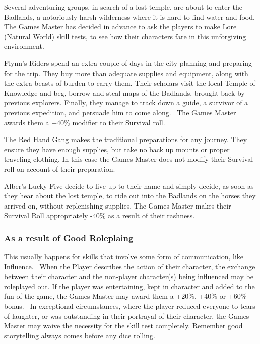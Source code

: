 \begin{rpg-examplebox}
Several adventuring groups, in search of a lost temple, are about to enter the Badlands, a notoriously harsh wilderness where it is hard to find water and food. The Games Master has decided in advance to ask the players to make Lore (Natural World) skill tests, to see how their characters fare in this unforgiving environment.

Flynn’s Riders spend an extra couple of days in the city planning and preparing for the trip. They buy more than adequate supplies and equipment, along with the extra beasts of burden to carry them. Their scholars visit the local Temple of Knowledge and beg, borrow and steal maps of the Badlands, brought back by previous explorers. Finally, they manage to track down a guide, a survivor of a previous expedition, and persuade him to come along.  The Games Master awards them a +40\% modifier to their Survival roll.

The Red Hand Gang makes the traditional preparations for any journey. They ensure they have enough supplies, but take no back up mounts or proper traveling clothing. In this case the Games Master does not modify their Survival roll on account of their preparation.

Alber’s Lucky Five decide to live up to their name and simply decide, as soon as they hear about the lost temple, to ride out into the Badlands on the horses they arrived on, without replenishing supplies. The Games Master makes their Survival Roll appropriately -40\% as a result of their rashness.
\end{rpg-examplebox}


\subsubsection{As a result of Good Roleplaing}
This usually happens for skills that involve some form of communication, like Influence.  When the Player describes the action of their character, the exchange between their character and the non-player character(s) being influenced may be roleplayed out. If the player was entertaining, kept in character and added to the fun of the game, the Games Master may award them a +20\%, +40\% or +60\% bonus.  In exceptional circumstances, where the player reduced everyone to tears of laughter, or was outstanding in their portrayal of their character, the Games Master may waive the necessity for the skill test completely. Remember good storytelling always comes before any dice rolling. 


